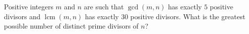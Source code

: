 Positive integers $m$ and $n$ are such that $\gcd(m,n)$ has exactly $5$ positive divisors and $\operatorname{lcm}(m,n)$ has exactly $30$ positive divisors. What is the greatest possible number of distinct prime divisors of $n$?
